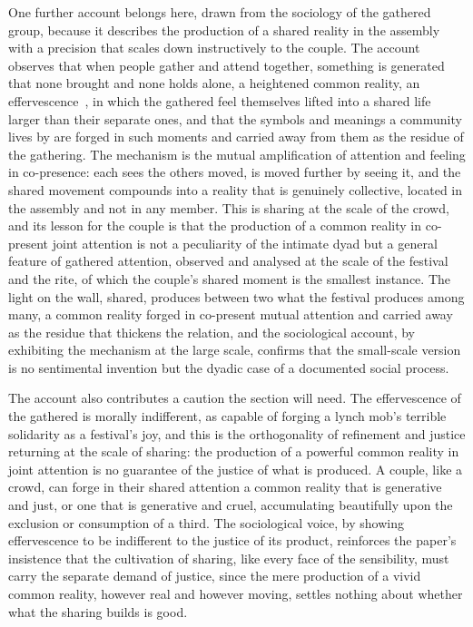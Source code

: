One further account belongs here, drawn from the sociology of the gathered group, because it describes the production of a shared reality in the assembly with a precision that scales down instructively to the couple. The account observes that when people gather and attend together, something is generated that none brought and none holds alone, a heightened common reality, an effervescence~\parencite{durkheim_elementary}, in which the gathered feel themselves lifted into a shared life larger than their separate ones, and that the symbols and meanings a community lives by are forged in such moments and carried away from them as the residue of the gathering. The mechanism is the mutual amplification of attention and feeling in co-presence: each sees the others moved, is moved further by seeing it, and the shared movement compounds into a reality that is genuinely collective, located in the assembly and not in any member. This is sharing at the scale of the crowd, and its lesson for the couple is that the production of a common reality in co-present joint attention is not a peculiarity of the intimate dyad but a general feature of gathered attention, observed and analysed at the scale of the festival and the rite, of which the couple's shared moment is the smallest instance. The light on the wall, shared, produces between two what the festival produces among many, a common reality forged in co-present mutual attention and carried away as the residue that thickens the relation, and the sociological account, by exhibiting the mechanism at the large scale, confirms that the small-scale version is no sentimental invention but the dyadic case of a documented social process.

The account also contributes a caution the section will need. The effervescence of the gathered is morally indifferent, as capable of forging a lynch mob's terrible solidarity as a festival's joy, and this is the orthogonality of refinement and justice returning at the scale of sharing: the production of a powerful common reality in joint attention is no guarantee of the justice of what is produced. A couple, like a crowd, can forge in their shared attention a common reality that is generative and just, or one that is generative and cruel, accumulating beautifully upon the exclusion or consumption of a third. The sociological voice, by showing effervescence to be indifferent to the justice of its product, reinforces the paper's insistence that the cultivation of sharing, like every face of the sensibility, must carry the separate demand of justice, since the mere production of a vivid common reality, however real and however moving, settles nothing about whether what the sharing builds is good.

